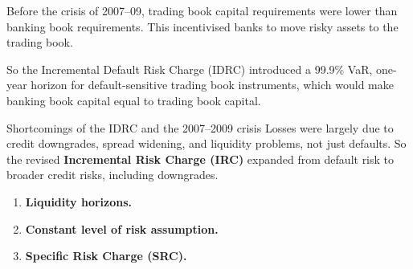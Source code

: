 

\begin{lettered}
\item Before the crisis of 2007--09, trading book capital requirements were lower
than banking book requirements. This incentivised banks to move risky assets to
the trading book.
\item So the Incremental Default Risk Charge (IDRC) introduced a 99.9\% VaR,
one-year horizon for default-sensitive trading book instruments, which would make
banking book capital equal to trading book capital.
\end{lettered}

\begin{ornotebox}{Shortcomings of the IDRC and the 2007--2009 crisis}
Losses were largely due to credit downgrades, spread widening, and liquidity
problems, not just defaults. So the revised \textbf{Incremental Risk Charge (IRC)}
expanded from default risk to broader credit risks, including downgrades.
\end{ornotebox}


\begin{enumerate}
\item[\textcolor{rust}{\sffamily\bfseries 1.}] \textbf{Liquidity horizons.}
\item[\textcolor{rust}{\sffamily\bfseries 2.}] \textbf{Constant level of risk
assumption.}
\item[\textcolor{rust}{\sffamily\bfseries 3.}] \textbf{Specific Risk Charge (SRC).}
\end{enumerate}

